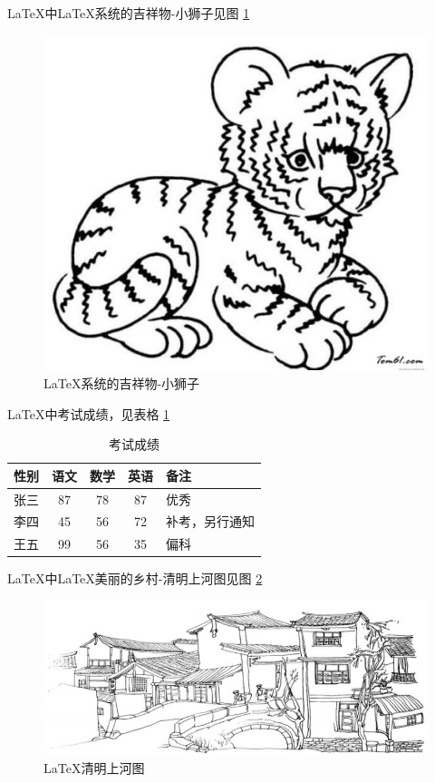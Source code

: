 \documentclass{article}
\begin{document}
	\graphicspath{{figures/}}%
	
	\LaTeX{}中\LaTeX 系统的吉祥物-小狮子见图 \ref{fig-lion}
	
	\begin{figure}[htbp] %
		\centering			%
		\includegraphics[scale=0.3]{lion}%
		\caption{\LaTeX 系统的吉祥物-小狮子} \label{fig-lion}
	\end{figure}
	
	
	\LaTeX{}中考试成绩，见表格 
	\ref{table-scores}
	
	\begin{table}[htbp]
		\centering
		\caption{考试成绩} 
		\label{table-scores}
		
		\begin{tabular}{|l|| c| c| c| p{2cm}|} %
		\hline
		性别 & 语文 & 数学 & 英语 & 备注\\
		\hline \hline
		张三 & 87 & 78 & 87& 优秀\\
		\hline
		李四 & 45 & 56 & 72 & 补考，另行通知\\
		\hline
		王五 & 99 & 56 & 35 & 偏科\\
		\hline
		\end{tabular}
	\end{table}
	
	\LaTeX{}中\LaTeX 美丽的乡村-清明上河图见图
	\ref{fig-mountain}
		
	\begin{figure}[htbp] %
		\centering			%
		\includegraphics[scale=0.3]{mountain}%
		\caption{\LaTeX 清明上河图} \label{fig-mountain}
	\end{figure}
	
\end{document}
